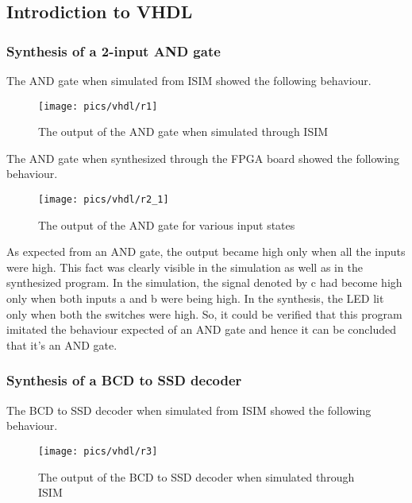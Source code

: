 \subsection{Introdiction to VHDL}

\subsubsection{Synthesis of a 2-input AND gate}

The AND gate when simulated from ISIM showed the following behaviour.

\begin{figure}[!h]
	\centering
	\texttt{[image: pics/vhdl/r1]}
	\caption{The output of the AND gate when simulated through ISIM}
	\label{fig:r1}
\end{figure}

The AND gate when synthesized through the FPGA board showed the following behaviour. 

\begin{figure}[!h]
	\centering
	\texttt{[image: pics/vhdl/r2\_1]}
	\caption{The output of the AND gate for various input states}
	\label{fig:r1}
\end{figure}

\noindent
As expected from an AND gate, the output became high only when all the inputs were high. This fact was clearly visible in the simulation as well as in the synthesized program. In the simulation, the signal denoted by c had become  high only when both inputs a and b were being high. In the synthesis, the LED lit only when both the switches were high. So, it could be verified that this program imitated the behaviour expected of an AND gate and hence it can be concluded that it's an AND gate.

\pagebreak

\subsubsection{Synthesis of a BCD to SSD decoder}

The  BCD to SSD decoder when simulated from ISIM showed the following behaviour. 

\begin{figure}[!h]
	\centering
	\texttt{[image: pics/vhdl/r3]}
	\caption{The output of the BCD to SSD decoder when simulated through ISIM}
	\label{fig:r3}
\end{figure}

